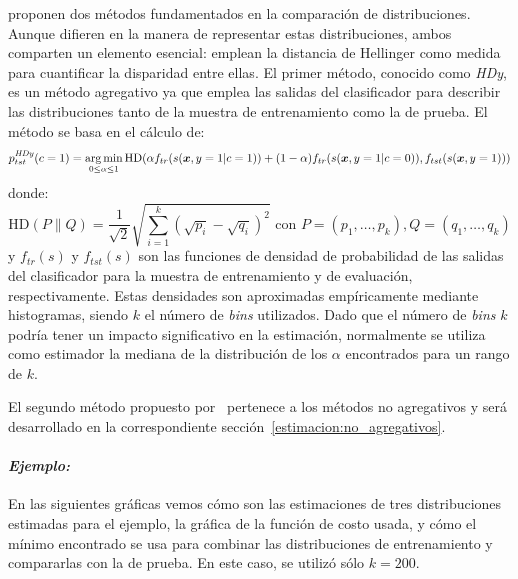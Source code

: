 \citet{gonzalez2013class} proponen dos métodos fundamentados en la comparación
de distribuciones. Aunque difieren en la manera de representar estas
distribuciones, ambos comparten un elemento esencial: emplean la distancia de
Hellinger como medida para cuantificar la disparidad entre ellas. El primer
método, conocido como {\it HDy}, es un método agregativo ya que emplea las
salidas del clasificador para describir las distribuciones tanto de la muestra
de entrenamiento como la de prueba. El método se basa en el cálculo de:
\begin{equation}\label{ecuacion:hdy}
    p^{\it HDy \/}_{tst}(c=1) = \operatorname*{arg\,min}_{0 \leq \alpha \leq 1}{\text{HD}}(\alpha f_{tr}{(s(\boldsymbol{x},y=1|c=1))}+(1-\alpha) f_{tr}{(s(\boldsymbol{x},y=1|c=0))}, f_{tst}{(s(\boldsymbol{x},y=1))})
\end{equation}
donde:
\begin{equation}\label{ecuacion:hd}
    {\text{HD}}(P \parallel Q)= \frac{1}{\sqrt{2}}{\sqrt {\sum _{i=1}^{k}{({\sqrt {p_{i}}}-{\sqrt {q_{i}}})}^{2}}} \text{ con } P=(p_1,\dots,p_k), Q=(q_1,\dots,q_k)
\end{equation}
y \(f_{tr}(s)\) y \(f_{tst}(s)\) son las funciones de densidad de probabilidad
de las salidas del clasificador para la muestra de entrenamiento y de
evaluación, respectivamente. Estas densidades son aproximadas empíricamente
mediante histogramas, siendo \(k\) el número de {\it bins\/} utilizados. Dado
que el número de {\it bins\/} \(k\) podría tener un impacto significativo en la
estimación, normalmente se utiliza como estimador la mediana de la distribución
de los \(\alpha\) encontrados para un rango de \(k\).

El segundo método propuesto por~\citet{gonzalez2013class} pertenece a los
métodos no agregativos y será desarrollado en la correspondiente
sección~\ref{estimacion:no_agregativos}.

\paragraph{\it Ejemplo:\/} En las siguientes gráficas vemos cómo son las
estimaciones de tres distribuciones estimadas para el ejemplo, la gráfica de la
función de costo usada, y cómo el mínimo encontrado se usa para combinar las
distribuciones de entrenamiento y compararlas con la de prueba. En este caso, se
utilizó sólo \(k=200\).

